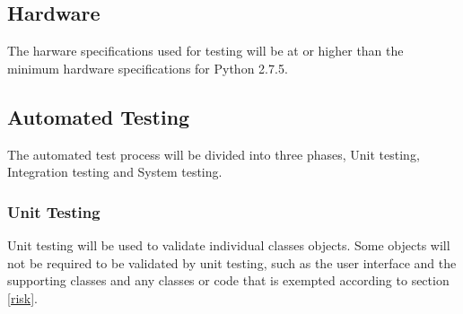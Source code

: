 \documentclass[report]{article}
\begin{document}
\subsection{Hardware}
The harware specifications used for testing will be at or higher than the minimum hardware specifications for Python 2.7.5.

\subsection{Automated Testing}
The automated test process will be divided into three phases, Unit testing, Integration testing and System testing.

\subsubsection{Unit Testing}
Unit testing will be used to validate individual classes objects. Some objects will not be required to be validated by unit testing, such as the user interface and the supporting classes and any classes or code that is exempted according to section \ref{risk}.
\end{document}
